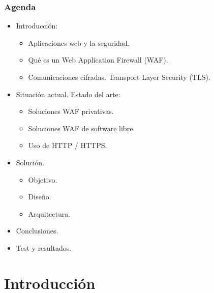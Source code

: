 \begin{frame}[shrink=20]
  \frametitle{Agenda}
  \begin{itemize}
    \item Introducción:
      \begin{itemize}
        \item Aplicaciones web y la seguridad.
        \item Qué es un Web Application Firewall (WAF).
        \item Comunicaciones cifradas. Transport Layer Security (TLS).
      \end{itemize}
    \item Situación actual. Estado del arte:
      \begin{itemize}
        \item Soluciones WAF privativas.
        \item Soluciones WAF de software libre.
        \item Uso de HTTP / HTTPS.
      \end{itemize}
    \item Solución.
      \begin{itemize}
        \item Objetivo.
        \item Diseño.
        \item Arquitectura.
      \end{itemize}
    \item Conclusiones.
    \item Test y resultados.
  \end{itemize}
\end{frame}

\section{Introducción}
